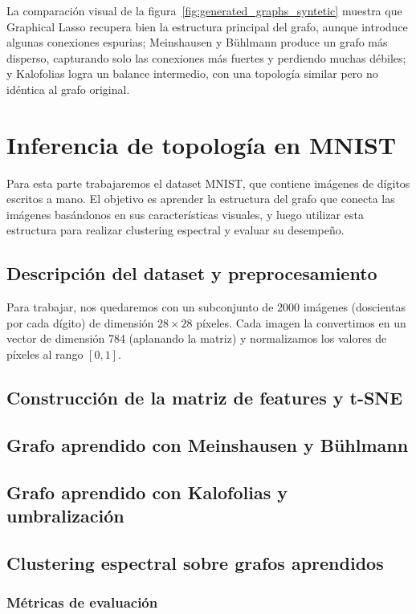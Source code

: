 \documentclass{article}
\begin{document}
La comparación visual de la figura~\ref{fig:generated_graphs_syntetic} muestra que Graphical Lasso recupera bien la estructura principal del grafo, aunque introduce algunas conexiones espurias; Meinshausen y Bühlmann produce un grafo más disperso, capturando solo las conexiones más fuertes y perdiendo muchas débiles; y Kalofolias logra un balance intermedio, con una topología similar pero no idéntica al grafo original. 


\section{Inferencia de topología en MNIST}
Para esta parte trabajaremos el dataset MNIST, que contiene imágenes de dígitos escritos a mano. El objetivo es aprender la estructura del grafo que conecta las imágenes basándonos en sus características visuales, y luego utilizar esta estructura para realizar clustering espectral y evaluar su desempeño.

\subsection{Descripción del dataset y preprocesamiento}
Para trabajar, nos quedaremos con un subconjunto de 2000 imágenes (doscientas por cada dígito) de dimensión $28 \times 28$ píxeles. Cada imagen la convertimos en un vector de dimensión 784 (aplanando la matriz) y normalizamos los valores de píxeles al rango $[0,1]$.

\subsection{Construcción de la matriz de features y t-SNE}

\subsection{Grafo aprendido con Meinshausen y Bühlmann}

\subsection{Grafo aprendido con Kalofolias y umbralización}

\subsection{Clustering espectral sobre grafos aprendidos}

\subsubsection{Métricas de evaluación}
\end{document}

